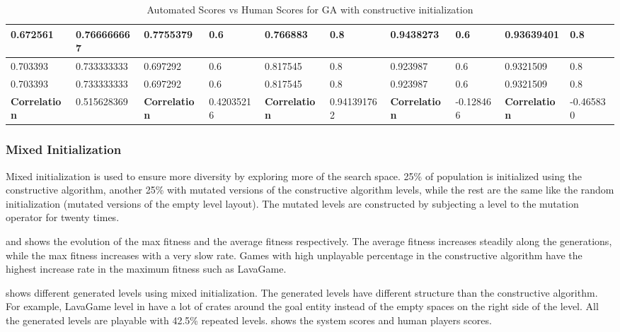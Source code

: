 \begin{landscape}
\begin{table}[!ht]
\begin{tabular}{|p{0.8in}|p{0.8in}|p{0.8in}|p{0.8in}|p{0.8in}|p{0.8in}|p{0.8in}|p{0.8in}|p{0.8in}|p{0.8in}|}
		\hline
		0.672561 & 0.766666667 & 0.7755379 & 0.6 & 0.766883 & 0.8 & 0.9438273 & 0.6 & 0.93639401 & 0.8\\
		\hline
		0.703393 & 0.733333333 & 0.697292 & 0.6 & 0.817545 & 0.8 & 0.923987 & 0.6 & 0.9321509 & 0.8\\
		\hline
		0.703393 & 0.733333333 & 0.697292 & 0.6 & 0.817545 & 0.8 & 0.923987 & 0.6 & 0.9321509 & 0.8\\
		\hline
		\textbf{Correlation} & 0.515628369 & \textbf{Correlation} & 0.42035216 & \textbf{Correlation} & 0.941391762 & \textbf{Correlation} & -0.128466 & \textbf{Correlation} & -0.465830\\
		\hline
	\end{tabular}
	\caption{Automated Scores vs Human Scores for GA with constructive initialization}
	\label{Table:constructiveGAScores}
\end{table}
\end{landscape}

\subsubsection{Mixed Initialization}
Mixed initialization is used to ensure more diversity by exploring more of the search space. 25\% of population is initialized using the constructive algorithm, another 25\% with mutated versions of the constructive algorithm levels, while the rest are the same like the random initialization (mutated versions of the empty level layout). The mutated levels are constructed by subjecting a level to the mutation operator for twenty times.\\\par 

 and  shows the evolution of the max fitness and the average fitness respectively. The average fitness increases steadily along the generations, while the max fitness increases with a very slow rate. Games with high unplayable percentage in the constructive algorithm have the highest increase rate in the maximum fitness such as LavaGame.



 shows different generated levels using mixed initialization. The generated levels have different structure than the constructive algorithm. For example, LavaGame level in  have a lot of crates around the goal entity instead of the empty spaces on the right side of the level. All the generated levels are playable with 42.5\% repeated levels.  shows the system scores and human players scores.

